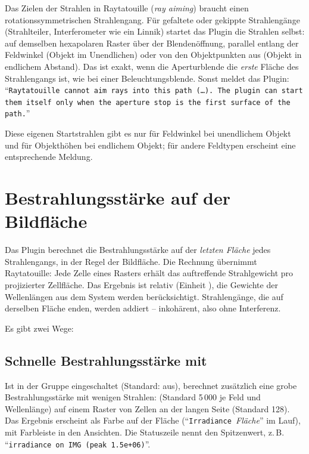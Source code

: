 Das Zielen der Strahlen in Raytatouille (\emph{ray aiming}) braucht einen rotationssymmetrischen
Strahlengang. Für gefaltete oder gekippte Strahlengänge (Strahlteiler, Interferometer wie ein
Linnik) startet das Plugin die Strahlen selbst: auf demselben hexapolaren Raster über der
Blendenöffnung, parallel entlang der Feldwinkel (Objekt im Unendlichen) oder von den
Objektpunkten aus (Objekt in endlichem Abstand). Das ist exakt, wenn die Aperturblende die
\emph{erste} Fläche des Strahlengangs ist, wie bei einer Beleuchtungsblende. Sonst meldet das
Plugin: \enquote{\texttt{Raytatouille cannot aim rays into this path (…). The plugin can start
them itself only when the aperture stop is the first surface of the path.}}

Diese eigenen Startstrahlen gibt es nur für Feldwinkel bei unendlichem Objekt und für
Objekthöhen bei endlichem Objekt; für andere Feldtypen erscheint eine entsprechende Meldung.

\section{Bestrahlungsstärke auf der Bildfläche}\label{sec:rt-bestrahlung}

Das Plugin berechnet die Bestrahlungsstärke auf der \emph{letzten Fläche} jedes Strahlengangs,
in der Regel der Bildfläche. Die Rechnung übernimmt Raytatouille: Jede Zelle eines Rasters
erhält das auftreffende Strahlgewicht pro projizierter Zellfläche. Das Ergebnis ist relativ
(Einheit ), die Gewichte der Wellenlängen aus dem System
werden berücksichtigt. Strahlengänge, die auf derselben Fläche enden, werden addiert --
inkohärent, also ohne Interferenz.

Es gibt zwei Wege:

\subsection{Schnelle Bestrahlungsstärke mit }

Ist in der Gruppe   eingeschaltet (Standard: aus), berechnet
 zusätzlich eine grobe Bestrahlungsstärke mit wenigen Strahlen:
 (Standard 5\,000 je Feld und Wellenlänge) auf einem Raster von
 Zellen an der langen Seite (Standard 128). Das Ergebnis erscheint als
Farbe auf der Fläche (\enquote{\texttt{Irradiance }\textit{Fläche}} im Lauf), mit Farbleiste in
den Ansichten. Die Statuszeile nennt den Spitzenwert, z.\,B. \enquote{\texttt{irradiance on IMG
(peak 1.5e+06)}}.

